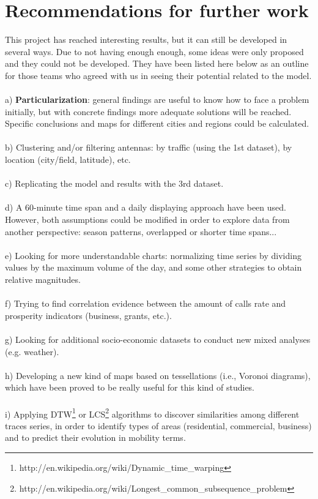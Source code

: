 \newpage
\section{Recommendations for further work}

This project has reached interesting results, but it can still be developed in several ways. Due to not having enough enough, some ideas were only proposed and they could not be developed. They have been listed here below as an outline for those teams who agreed with us in seeing their potential related to the model.
\\
\\
a) {\bf Particularization}: general findings are useful to know how to face a problem initially, but with concrete findings more adequate solutions will be reached. Specific conclusions and maps for different cities and regions could be calculated.
\\
\\
b) Clustering and/or filtering antennas: by traffic (using the 1st dataset), by location (city/field, latitude), etc.
\\
\\
c) Replicating the model and results with the 3rd dataset.
\\
\\
d) A 60-minute time span and a daily displaying approach have been used. However, both assumptions could be modified in order to explore data from another perspective: season patterns, overlapped or shorter time spans...
\\
\\
e) Looking for more understandable charts: normalizing time series by dividing values by the maximum volume of the day, and some other strategies to obtain relative magnitudes.
\\
\\
f) Trying to find correlation evidence between the amount of calls rate and prosperity indicators (business, grants, etc.).
\\
\\
g) Looking for additional socio-economic datasets to conduct new mixed analyses (e.g. weather).
\\
\\
h) Developing a new kind of maps based on tessellations (i.e., Voronoi diagrams), which have been proved to be really useful for this kind of studies.
\\
\\
i) Applying DTW\footnote{http://en.wikipedia.org/wiki/Dynamic\_time\_warping} or LCS\footnote{http://en.wikipedia.org/wiki/Longest\_common\_subsequence\_problem} algorithms to discover similarities among different traces series, in order to identify types of areas (residential, commercial, business) and to predict their evolution in mobility terms.
